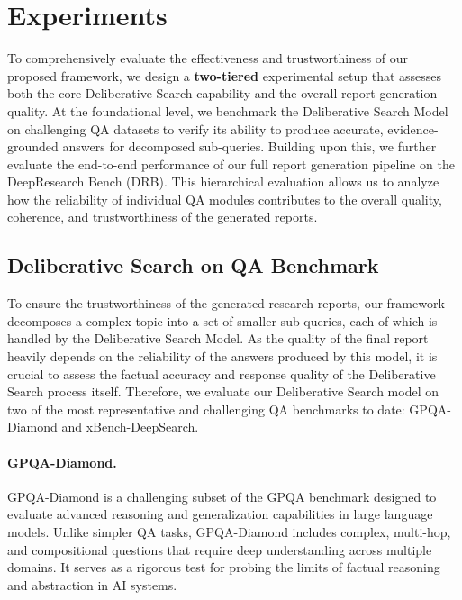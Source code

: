 \documentclass[11pt]{article}
\begin{document}
\section{Experiments}
To comprehensively evaluate the effectiveness and trustworthiness of our proposed framework, we design a \textbf{two-tiered} experimental setup that assesses both the core Deliberative Search capability and the overall report generation quality. At the foundational level, we benchmark the Deliberative Search Model on challenging QA datasets to verify its ability to produce accurate, evidence-grounded answers for decomposed sub-queries. Building upon this, we further evaluate the end-to-end performance of our full report generation pipeline on the DeepResearch Bench (DRB). This hierarchical evaluation allows us to analyze how the reliability of individual QA modules contributes to the overall quality, coherence, and trustworthiness of the generated reports.

\subsection{Deliberative Search on QA Benchmark}
To ensure the trustworthiness of the generated research reports, our framework decomposes a complex topic into a set of smaller sub-queries, each of which is handled by the Deliberative Search Model. As the quality of the final report heavily depends on the reliability of the answers produced by this model, it is crucial to assess the factual accuracy and response quality of the Deliberative Search process itself. Therefore, we evaluate our Deliberative Search model on two of the most representative and challenging QA benchmarks to date: GPQA-Diamond and xBench-DeepSearch.

\paragraph{GPQA-Diamond.}  
GPQA-Diamond is a challenging subset of the GPQA benchmark\cite{rein2024gpqa} designed to evaluate advanced reasoning and generalization capabilities in large language models. Unlike simpler QA tasks, GPQA-Diamond includes complex, multi-hop, and compositional questions that require deep understanding across multiple domains. It serves as a rigorous test for probing the limits of factual reasoning and abstraction in AI systems.
\end{document}
